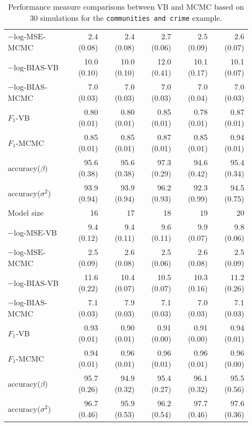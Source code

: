 \documentclass[11pt]{article}
\newtheorem{Main Result}{Main Result}
\begin{document}
\begin{table}[h]
{\begin{tabular}{l|rrrrr}
			$-$log-MSE-MCMC  & 2.4   (0.08) & 2.4 (0.08)   & 2.7 (0.06) & 2.5 (0.09) & 2.6  (0.07) \\
			$-$log-BIAS-VB   & 10.0  (0.10) & 10.0 (0.10)  & 12.0 (0.41) & 10.1 (0.17) & 10.1 (0.07) \\
			$-$log-BIAS-MCMC & 7.0   (0.03) & 7.0  (0.03)  & 7.0  (0.03) & 7.0  (0.04) & 7.0  (0.03) \\
			$F_1$-VB         & 0.80  (0.01) & 0.80  (0.01) & 0.85  (0.01) & 0.78  (0.01) & 0.87   (0.01) \\
			$F_1$-MCMC       & 0.85  (0.01) & 0.85  (0.01) & 0.87  (0.01) & 0.85  (0.01) & 0.94   (0.01) \\
			accuracy($\beta$)     & 95.6  (0.38) & 95.6  (0.38) & 97.3  (0.29) & 94.6  (0.42) & 95.4  (0.34) \\
			accuracy($\sigma^2$)  & 93.9  (0.94) & 93.9  (0.94) & 96.2  (0.93) & 92.3  (0.99) & 94.5  (0.75) \\
			\hline
			\hline
			Model size & 16 & 17 & 18 & 19 & 20  \\
			\hline
			$-$log-MSE-VB    & 9.4   (0.12) & 9.4   (0.11) & 9.6  (0.11) & 9.9  (0.07) & 9.8  (0.06) \\
			$-$log-MSE-MCMC  & 2.5   (0.09) & 2.6   (0.08) & 2.5  (0.06) & 2.6  (0.08) & 2.5  (0.09) \\
			$-$log-BIAS-VB   & 11.6  (0.22) & 10.4  (0.07) & 10.5 (0.07) & 10.3 (0.16) & 11.2 (0.26) \\
			$-$log-BIAS-MCMC & 7.1   (0.03) & 7.9   (0.03) & 7.1  (0.03) & 7.0  (0.03) & 7.1  (0.03) \\
			$F_1$-VB         & 0.93  (0.01) & 0.90  (0.01) & 0.91   (0.00) & 0.91   (0.00) & 0.94   (0.01) \\
			$F_1$-MCMC       & 0.94  (0.01) & 0.96  (0.01) & 0.96   (0.01) & 0.96   (0.01) & 0.96   (0.00) \\
			accuracy($\beta$)     & 95.7  (0.26) & 94.9  (0.32) & 95.4  (0.27) & 96.1  (0.32) & 95.5  (0.56) \\
			accuracy($\sigma^2$)  & 96.7  (0.46) & 95.9  (0.53) & 96.2  (0.54) & 97.7  (0.46) & 97.6  (0.36) \\
			\hline
		\end{tabular}
		\caption{Performance measure comparisons between VB and MCMC
			based on 30 simulations for the {\tt communities and crime} example.}
		\label{tab:communitiesAndCrime}
	}
\end{table}
\end{document}
